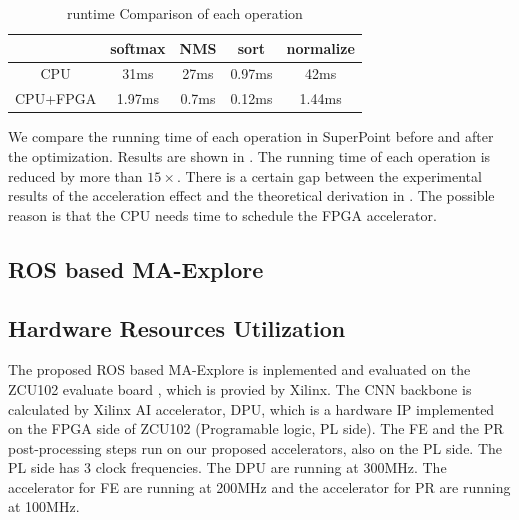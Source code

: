 \begin{table}[t]
  \centering
  \caption{runtime Comparison of each operation}
\begin{tabular}{|c|c|c|c|c|}
  \hline
             &    softmax &        NMS &       sort &  normalize \bigstrut\\
  \hline
         CPU &       31ms &       27ms &       0.97ms &       42ms \bigstrut\\
  \hline
    CPU+FPGA &     1.97ms &      0.7ms &     0.12ms &     1.44ms \bigstrut\\
  \hline
  \end{tabular}  
  
  \label{tab:optimization}%
\end{table}%

We compare the running time of each operation in SuperPoint before and after the optimization. Results are shown in . The running time of each operation is reduced by more than $15\times$. There is a certain gap between the experimental results of the acceleration effect and the theoretical derivation in . The possible reason is that the CPU needs time to schedule the FPGA accelerator.

\subsection{ ROS based MA-Explore }

\subsection {Hardware Resources Utilization}

The proposed ROS based MA-Explore is inplemented and evaluated on the ZCU102 evaluate board \cite{zcu102}, which is provied by Xilinx. The CNN backbone is calculated by Xilinx AI accelerator, DPU\cite{dpu}, which is a hardware IP implemented on the FPGA side of ZCU102 (Programable logic, PL side). The FE and the PR post-processing steps run on our proposed accelerators, also on the PL side. The PL side has 3 clock frequencies. The DPU are running at 300MHz. The accelerator for FE are running at 200MHz and the accelerator for PR are running at 100MHz.

